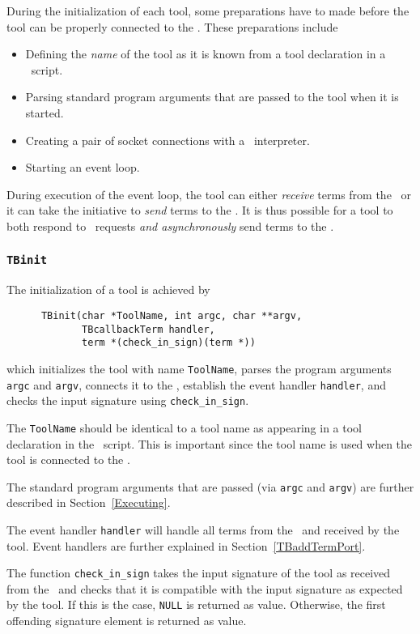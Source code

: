 During the initialization of each tool, some preparations have to made
before the tool can be properly connected to the \TB. These preparations
include
\begin{itemize}
\item Defining the {\em name} of the tool as it is known from a tool declaration
in a \T\ script.
\item Parsing standard program arguments that are passed to the tool
when it is started.
\item Creating a pair of socket connections with a \TB\ interpreter.
\item Starting an event loop.
\end{itemize}

During execution of the event loop, the tool can either {\em receive} terms from
the \TB\ or it can take the initiative to {\em send} terms to the \TB.
It is thus possible for a tool to both respond to \TB\ requests
{\em and asynchronously} send terms to the \TB.

\subsubsection{\label{TBinit}{\tt TBinit}}

The initialization of a tool is achieved by
\begin{verbatim}
      TBinit(char *ToolName, int argc, char **argv,
             TBcallbackTerm handler,
             term *(check_in_sign)(term *))
\end{verbatim}
which initializes the tool with name {\tt ToolName},
parses the program arguments {\tt argc} and {\tt argv},
connects it to the \TB, establish the event handler {\tt handler},
and checks the input signature using {\tt check\_in\_sign}.

The {\tt ToolName} should be identical to a tool name as appearing in
a tool declaration in the \T\ script. This is important since the tool name
is used when the tool is connected to the \TB.

The standard program arguments that are passed (via  {\tt argc} and {\tt argv})
are further described in Section~\ref{Executing}.

The event handler {\tt handler} will handle all terms
from the \TB\ and received by the tool. Event handlers are further explained
in Section~\ref{TBaddTermPort}.

The function {\tt check\_in\_sign} takes the input signature of the
tool as received from the \TB\ and checks that it is compatible with
the input signature as expected by the tool.  If this is the case,
{\tt NULL} is returned as value.  Otherwise, the first offending
signature element is returned as value.

